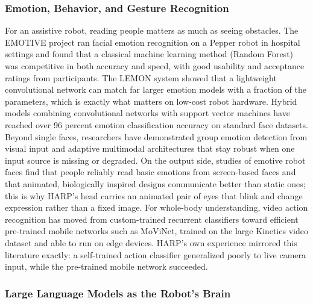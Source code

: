 \documentclass[11pt,a4paper]{article}
\begin{document}
\subsubsection{Emotion, Behavior, and Gesture Recognition}

For an assistive robot, reading people matters as much as seeing obstacles. The EMOTIVE project ran facial emotion recognition on a Pepper robot in hospital settings and found that a classical machine learning method (Random Forest) was competitive in both accuracy and speed, with good usability and acceptance ratings from participants. The LEMON system showed that a lightweight convolutional network can match far larger emotion models with a fraction of the parameters, which is exactly what matters on low-cost robot hardware. Hybrid models combining convolutional networks with support vector machines have reached over 96 percent emotion classification accuracy on standard face datasets. Beyond single faces, researchers have demonstrated group emotion detection from visual input and adaptive multimodal architectures that stay robust when one input source is missing or degraded. On the output side, studies of emotive robot faces find that people reliably read basic emotions from screen-based faces and that animated, biologically inspired designs communicate better than static ones; this is why HARP's head carries an animated pair of eyes that blink and change expression rather than a fixed image. For whole-body understanding, video action recognition has moved from custom-trained recurrent classifiers toward efficient pre-trained mobile networks such as MoViNet, trained on the large Kinetics video dataset and able to run on edge devices. HARP's own experience mirrored this literature exactly: a self-trained action classifier generalized poorly to live camera input, while the pre-trained mobile network succeeded.

\subsubsection{Large Language Models as the Robot's Brain}
\end{document}
